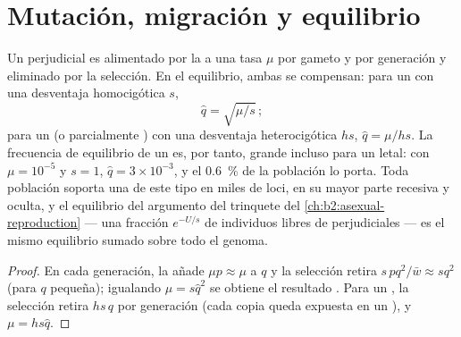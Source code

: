 \section{Mutación, migración y equilibrio}

\begin{theorem}\label{thm:b2:population-genetics:balance}
Un  perjudicial es alimentado por la  a una tasa $\mu$ por
gameto y por generación y eliminado por la selección. En el equilibrio,
ambas se compensan: para un   con una desventaja homocigótica
$s$,
\[
\hat q = \sqrt{\mu/s}\,;
\]
para un   (o parcialmente ) con una desventaja
heterocigótica $hs$, $\hat q = \mu/hs$. La frecuencia de equilibrio de un
 es, por tanto, grande incluso para un letal: con $\mu = 10^{-5}$ y
$s = 1$, $\hat q = 3\times 10^{-3}$, y el \qty{0.6}{\%} de la población lo
porta. Toda población soporta una \emph{} de este tipo en
miles de loci, en su mayor parte recesiva y oculta, y el equilibrio del
argumento del trinquete del \cref{ch:b2:asexual-reproduction}
--- una fracción $e^{-U/s}$ de individuos libres de 
perjudiciales --- es el mismo equilibrio sumado sobre todo el genoma.
\end{theorem}
\begin{proof}
En cada generación, la  añade $\mu p \approx \mu$ a $q$ y la
selección retira $s\,pq^{2}/\bar w \approx sq^{2}$ (para $q$ pequeña);
igualando $\mu = s\hat q^{2}$ se obtiene el resultado . Para un
 , la selección retira $hs\,q$ por generación (cada copia
queda expuesta en un ), y $\mu = hs\hat q$.
\end{proof}

